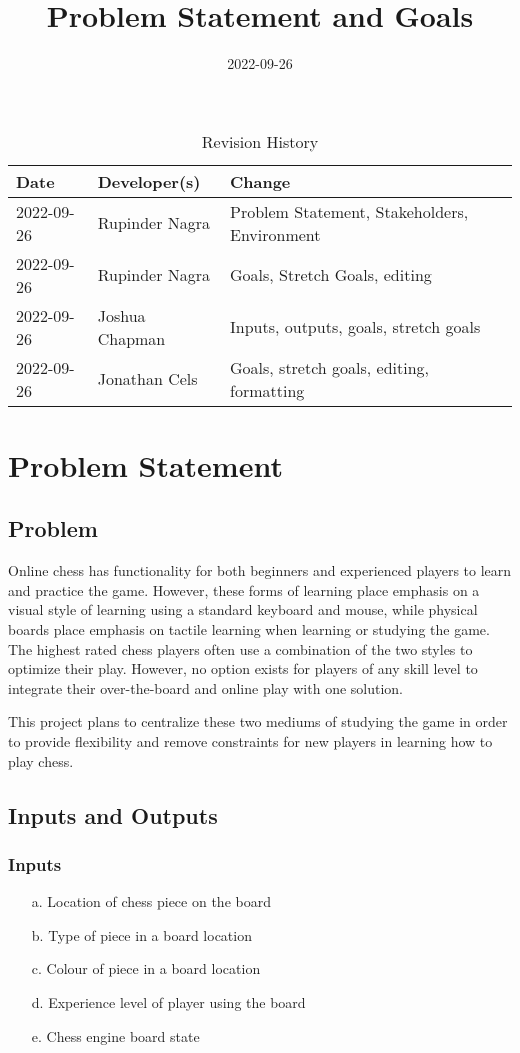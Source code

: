 \documentclass{article}
\title{Problem Statement and Goals\\\progname}
\author{\authname}
\date{2022-09-26}
\begin{document}
\maketitle

\begin{table}[hp]
\caption{Revision History} \label{TblRevisionHistory}
\begin{tabularx}{\textwidth}{llX}
\toprule
\textbf{Date} & \textbf{Developer(s)} & \textbf{Change}\\
\midrule
2022-09-26 & Rupinder Nagra & Problem Statement, Stakeholders, Environment\\
2022-09-26 & Rupinder Nagra & Goals, Stretch Goals, editing\\
2022-09-26 & Joshua Chapman & Inputs, outputs, goals, stretch goals\\
2022-09-26 & Jonathan Cels & Goals, stretch goals, editing, formatting\\
\bottomrule
\end{tabularx}
\end{table}

\section{Problem Statement}

\subsection{Problem}
{Online chess has functionality for both beginners and experienced players to learn and practice the game. 
However, these forms of learning place emphasis on a visual style of learning using a standard keyboard and mouse, while physical boards place emphasis on tactile learning when learning or studying the game.
The highest rated chess players often use a combination of the two styles to optimize their play. However, no option exists for players of any skill level to integrate their over-the-board and online play with one solution.}

\medskip
{This project plans to centralize these two mediums of studying the game in order to provide flexibility and remove constraints for new players in learning how to play chess.}

\subsection{Inputs and Outputs}

\subsubsection{Inputs}
\begin{enumerate}
    \item[a.] Location of chess piece on the board
    \item[b.] Type of piece in a board location
    \item[c.] Colour of piece in a board location
    \item[d.] Experience level of player using the board
    \item[e.] Chess engine board state
\end{enumerate}
\end{document}
